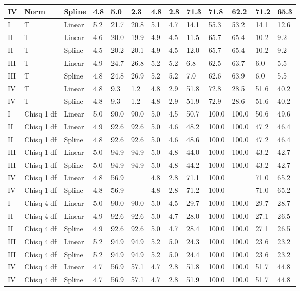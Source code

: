 \documentclass{article}\usepackage[]{graphicx}\usepackage[]{color}
\begin{document}
\begin{table}[ht]
\begin{tabular}{lll|lllll|lllll}
  IV & Norm & Spline & 4.8 & 5.0 & 2.3 & 4.8 & 2.8 & 71.3 & 71.8 & 62.2 & 71.2 & 65.3 \\ 
   \hline
I & T & Linear & 5.2 & 21.7 & 20.8 & 5.1 & 4.7 & 14.1 & 55.3 & 53.2 & 14.1 & 12.6 \\ 
  II & T & Linear & 4.6 & 20.0 & 19.9 & 4.9 & 4.5 & 11.5 & 65.7 & 65.4 & 10.2 & 9.2 \\ 
  II & T & Spline & 4.5 & 20.2 & 20.1 & 4.9 & 4.5 & 12.0 & 65.7 & 65.4 & 10.2 & 9.2 \\ 
  III & T & Linear & 4.9 & 24.7 & 26.8 & 5.2 & 5.2 & 6.8 & 62.5 & 63.7 & 6.0 & 5.5 \\ 
  III & T & Spline & 4.8 & 24.8 & 26.9 & 5.2 & 5.2 & 7.0 & 62.6 & 63.9 & 6.0 & 5.5 \\ 
  IV & T & Linear & 4.8 & 9.3 & 1.2 & 4.8 & 2.9 & 51.8 & 72.8 & 28.5 & 51.6 & 40.2 \\ 
  IV & T & Spline & 4.8 & 9.3 & 1.2 & 4.8 & 2.9 & 51.9 & 72.9 & 28.6 & 51.6 & 40.2 \\ 
   \hline
I & Chisq 1 df & Linear & 5.0 & 90.0 & 90.0 & 5.0 & 4.5 & 50.7 & 100.0 & 100.0 & 50.6 & 49.6 \\ 
  II & Chisq 1 df & Linear & 4.9 & 92.6 & 92.6 & 5.0 & 4.6 & 48.2 & 100.0 & 100.0 & 47.2 & 46.4 \\ 
  II & Chisq 1 df & Spline & 4.8 & 92.6 & 92.6 & 5.0 & 4.6 & 48.6 & 100.0 & 100.0 & 47.2 & 46.4 \\ 
  III & Chisq 1 df & Linear & 5.0 & 94.9 & 94.9 & 5.0 & 4.8 & 44.0 & 100.0 & 100.0 & 43.2 & 42.7 \\ 
  III & Chisq 1 df & Spline & 5.0 & 94.9 & 94.9 & 5.0 & 4.8 & 44.2 & 100.0 & 100.0 & 43.2 & 42.7 \\ 
  IV & Chisq 1 df & Linear & 4.8 & 56.9 &  & 4.8 & 2.8 & 71.1 & 100.0 &  & 71.0 & 65.2 \\ 
  IV & Chisq 1 df & Spline & 4.8 & 56.9 &  & 4.8 & 2.8 & 71.2 & 100.0 &  & 71.0 & 65.2 \\ 
   \hline
I & Chisq 4 df & Linear & 5.0 & 90.0 & 90.0 & 5.0 & 4.5 & 29.7 & 100.0 & 100.0 & 29.7 & 28.7 \\ 
  II & Chisq 4 df & Linear & 4.9 & 92.6 & 92.6 & 5.0 & 4.7 & 28.0 & 100.0 & 100.0 & 27.1 & 26.5 \\ 
  II & Chisq 4 df & Spline & 4.9 & 92.6 & 92.6 & 5.0 & 4.7 & 28.4 & 100.0 & 100.0 & 27.1 & 26.5 \\ 
  III & Chisq 4 df & Linear & 5.2 & 94.9 & 94.9 & 5.2 & 5.0 & 24.3 & 100.0 & 100.0 & 23.6 & 23.2 \\ 
  III & Chisq 4 df & Spline & 5.2 & 94.9 & 94.9 & 5.2 & 5.0 & 24.4 & 100.0 & 100.0 & 23.6 & 23.2 \\ 
  IV & Chisq 4 df & Linear & 4.7 & 56.9 & 57.1 & 4.7 & 2.8 & 51.8 & 100.0 & 100.0 & 51.7 & 44.8 \\ 
  IV & Chisq 4 df & Spline & 4.7 & 56.9 & 57.1 & 4.7 & 2.8 & 51.9 & 100.0 & 100.0 & 51.7 & 44.8 \\ 
   \hline
\end{tabular}
\end{table}
\end{document}
